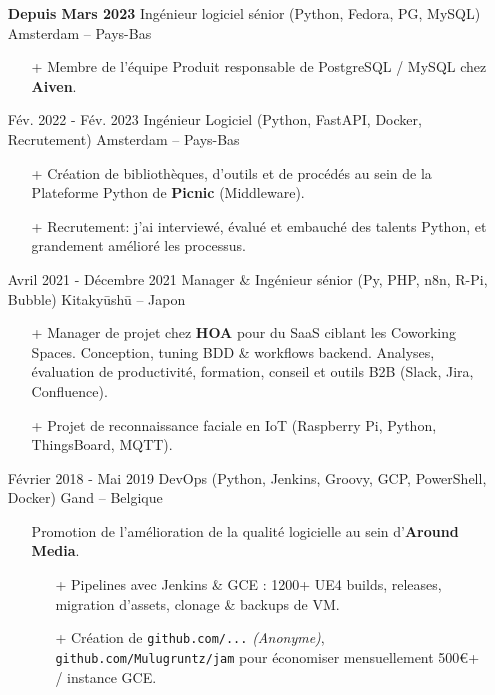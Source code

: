 \documentclass{res}
\begin{document}
\begin{resume}
	\begin{itemize}
        \item[] \textbf{Depuis Mars 2023} \tabto{5cm} Ing\'enieur logiciel s\'enior (Python, Fedora, PG, MySQL) \hfill Amsterdam -- Pays-Bas
        \begin{itemize}
            \item[+] Membre de l'\'equipe Produit responsable de PostgreSQL / MySQL chez \textbf{Aiven}.
        \end{itemize}
        \item[] F\'ev. 2022 - F\'ev. 2023 \tabto{5cm} Ing\'enieur Logiciel (Python, FastAPI, Docker, Recrutement) \hfill Amsterdam -- Pays-Bas
		\begin{itemize}
			\item[+] Cr\'eation de biblioth\`eques, d'outils et de proc\'ed\'es au sein de la Plateforme Python de \textbf{Picnic} (Middleware).
			\item[+] Recrutement: j'ai interview\'e, \'evalu\'e et embauch\'e des talents Python, et grandement am\'elior\'e les processus.
		\end{itemize}
		\item[] Avril 2021 - D\'ecembre 2021 \tabto{5cm} Manager \& Ing\'enieur s\'enior (Py, PHP, n8n, R-Pi, Bubble) \hfill Kitaky\=ush\=u -- Japon
		\begin{itemize}
			\item[+] Manager de projet chez \textbf{HOA} pour du SaaS ciblant les Coworking Spaces. Conception, tuning BDD \& workflows backend. Analyses, \'evaluation de productivit\'e, formation, conseil et outils B2B (Slack, Jira, Confluence).
			\item[+] Projet de reconnaissance faciale en IoT (Raspberry Pi, Python, ThingsBoard, MQTT).
		\end{itemize}
		\item[] F\'evrier  2018 - Mai 2019 \tabto{5cm} DevOps (Python, Jenkins, Groovy, GCP, PowerShell, Docker) \hfill Gand -- Belgique
		\begin{itemize}
			\item[] Promotion de l'am\'elioration de la qualit\'e logicielle au sein d'\textbf{Around Media}.
			\begin{itemize}
				\item[+] Pipelines avec Jenkins \& GCE : 1200+ UE4 builds, releases, migration d'assets, clonage \& backups de VM.
				\item[+] Cr\'eation de \ifisanon \texttt{github.com/...} \textit{(Anonyme)}, \else \texttt{github.com/Mulugruntz/jam} \fi pour \'economiser mensuellement 500\euro+ / instance GCE.

\end{itemize}
\end{itemize}
\end{itemize}
\end{resume}
\end{document}
